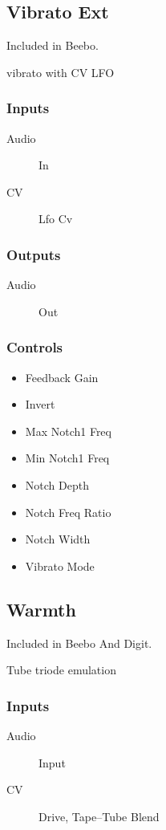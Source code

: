 \subsection{Vibrato Ext}

Included in Beebo.

vibrato with CV LFO



\subsubsection{Inputs}
\begin{description}
\item [Audio] In
\item [CV] Lfo Cv
\end{description}

\subsubsection{Outputs}
\begin{description}
\item [Audio] Out
\end{description}

\subsubsection{Controls}
\begin{itemize}
\item Feedback Gain
\item Invert
\item Max Notch1 Freq
\item Min Notch1 Freq
\item Notch Depth
\item Notch Freq Ratio
\item Notch Width
\item Vibrato Mode
\end{itemize}

\subsection{Warmth}

Included in Beebo And Digit.

Tube triode emulation



\subsubsection{Inputs}
\begin{description}
\item [Audio] Input
\item [CV] Drive, Tape--Tube Blend
\end{description}

